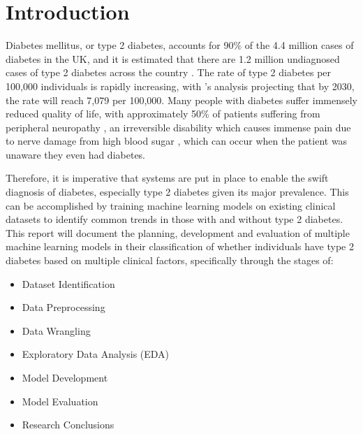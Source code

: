 \documentclass[12pt]{report}
\newcommand{\para}{\vspace{8pt}\noindent}
\begin{document}


\chapter{Introduction}

Diabetes mellitus, or type 2 diabetes, accounts for 90\% of the 4.4 million cases of diabetes in the UK, and it is estimated that 
there are 1.2 million undiagnosed cases of type 2 diabetes across the country \autocite{diabetes_uk_how_nodate}. The rate of type 
2 diabetes per 100,000 individuals is rapidly increasing, with \textcite{khan_epidemiology_2020}'s analysis projecting that by 
2030, the rate will reach 7,079 per 100,000. Many people with diabetes suffer immensely reduced quality of life, with approximately 50\% 
of patients suffering from peripheral neuropathy \autocite{dhanapalaratnam_effect_2024}, an irreversible disability which causes immense pain due 
to nerve damage from high blood sugar \autocite{nhs_peripheral_2022}, which can occur when the patient was unaware they even 
had diabetes. 

\para
Therefore, it is imperative that systems are put in place to enable the swift diagnosis of diabetes, especially type 2 diabetes 
given its major prevalence. This can be accomplished by training machine learning models on existing clinical datasets 
to identify common trends in those with and without type 2 diabetes. This report will document the planning, development 
and evaluation of multiple machine learning models in their classification of whether individuals have type 2 diabetes based 
on multiple clinical factors, specifically through the stages of:

\begin{itemize}
    \item Dataset Identification
    \item Data Preprocessing
    \item Data Wrangling
    \item Exploratory Data Analysis (EDA)
    \item Model Development 
    \item Model Evaluation
    \item Research Conclusions
\end{itemize}
\end{document}
